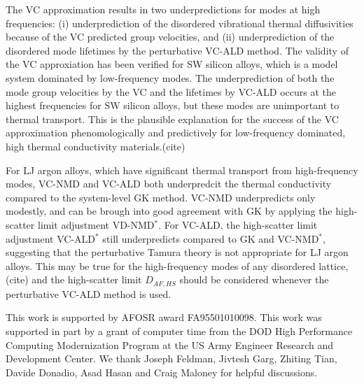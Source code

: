 \documentclass[aps,prb,onecolumn,preprint,superscriptaddress,amsmath,amssymb,floatfix]{revtex4}
\begin{document}
The VC approximation results in two 
underpredictions for modes at high frequencies: 
(i) underprediction of the disordered vibrational 
thermal diffusivities because of the VC predicted group velocities, 
and (ii) underprediction of the disordered mode lifetimes by 
the perturbative VC-ALD method. 
The validity of the VC approxiation has been verified for SW silicon 
alloys, which is a model system dominated by low-frequency modes. 
The underprediction of both the 
mode group velocities by the VC and the lifetimes by VC-ALD 
occurs at the highest 
frequencies for SW silicon alloys, but these modes are unimportant 
to thermal transport. 
This is the plausible explanation for the success of the VC 
approximation phenomologically and predictively for low-frequency 
dominated, high thermal conductivity materials.(cite)

For LJ argon alloys, which have significant thermal transport 
from high-frequency modes, VC-NMD and VC-ALD both underpredcit the 
thermal conductivity compared to the system-level GK method. 
VC-NMD underpredicts only modestly, and can be brough into good 
agreement with GK by applying the high-scatter limit adjustment 
VD-NMD$^*$. For VC-ALD, the high-scatter limit adjustment VC-ALD$^*$ 
still underpredicts compared to GK and VC-NMD$^*$, suggesting that 
the perturbative Tamura theory is not appropriate for LJ argon alloys. 
This may be true for the high-frequency modes of any disordered 
lattice,(cite) and the high-scatter limit $D_{AF,HS}$ should be 
considered whenever the perturbative VC-ALD method is used.

\begin{acknowledgements}
This work is supported by AFOSR award FA95501010098. 
This work was supported in part by a grant of computer time from the DOD 
High Performance Computing Modernization Program at the US Army Engineer 
Research and Development Center. 
We thank Joseph Feldman, Jivtesh Garg, Zhiting Tian, Davide Donadio, 
Asad Hasan and Craig Maloney for helpful discussions.
\end{acknowledgements}

\appendix
\end{document}
